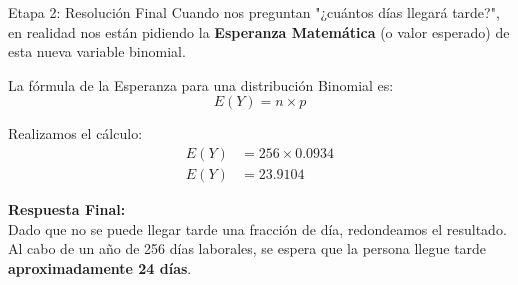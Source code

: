\documentclass[11pt, aspectratio=169]{beamer}
\begin{document}
\begin{frame}{Etapa 2: Resolución Final}
    Cuando nos preguntan "¿cuántos días llegará tarde?", en realidad nos están pidiendo la \textbf{Esperanza Matemática} (o valor esperado) de esta nueva variable binomial.
    
    \vspace{0.3cm}
    La fórmula de la Esperanza para una distribución Binomial es:
    \begin{equation*}
        E(Y) = n \times p
    \end{equation*}
    
    Realizamos el cálculo:
    \begin{align*}
        E(Y) &= 256 \times 0.0934 \\
        E(Y) &= 23.9104
    \end{align*}
    
    \vspace{0.3cm}
    \textbf{Respuesta Final:} \\
    Dado que no se puede llegar tarde una fracción de día, redondeamos el resultado. Al cabo de un año de 256 días laborales, se espera que la persona llegue tarde \textbf{aproximadamente 24 días}.
\end{frame}
\end{document}
